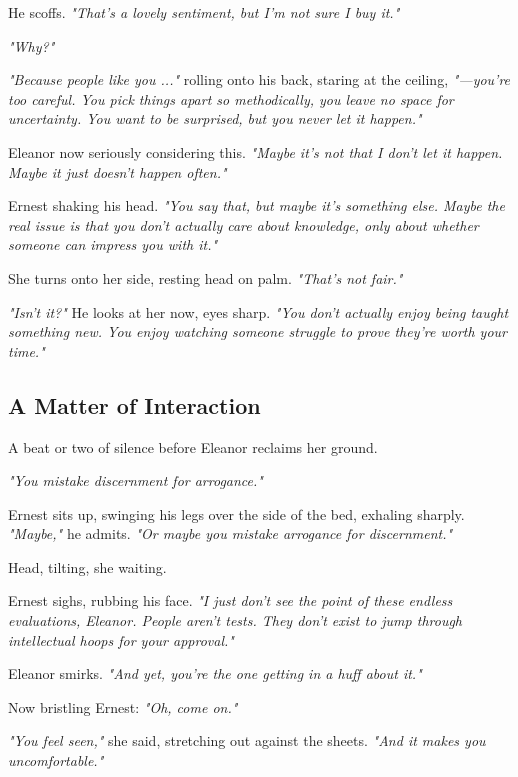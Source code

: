 He scoffs.  
\textit{"That’s a lovely sentiment, but I’m not sure I buy it."}

\textit{"Why?"}

\smallskip

\textit{"Because people like you ..."} rolling onto his back, staring at the ceiling, \textit{"—you’re too careful. You pick things apart so methodically, you leave no space for uncertainty. You want to be surprised, but you never let it happen."}

Eleanor now seriously considering this.  
\textit{"Maybe it’s not that I don’t let it happen. Maybe it just doesn’t happen often."}

Ernest shaking his head.  
\textit{"You say that, but maybe it’s something else. Maybe the real issue is that you don’t actually care about knowledge, only about whether someone can impress you with it."}

\noindent
She turns onto her side, resting head on palm.  
\textit{"That’s not fair."}

\textit{"Isn’t it?"} He looks at her now, eyes sharp.  
\textit{"You don’t actually enjoy being taught something new. You enjoy watching someone struggle to prove they’re worth your time."}

\subsection*{A Matter of Interaction}
A beat or two of silence before Eleanor reclaims her ground.

\textit{"You mistake discernment for arrogance."}

Ernest sits up, swinging his legs over the side of the bed, exhaling sharply.  
\textit{"Maybe,"} he admits.  
\textit{"Or maybe you mistake arrogance for discernment."}

Head, tilting, she waiting.

Ernest sighs, rubbing his face.  
\textit{"I just don’t see the point of these endless evaluations, Eleanor. People aren’t tests. They don’t exist to jump through intellectual hoops for your approval."}

Eleanor smirks.  
\textit{"And yet, you’re the one getting in a huff about it."}

Now bristling Ernest:  
\textit{"Oh, come on."}

\textit{"You feel seen,"} she said, stretching out against the sheets.  
\textit{"And it makes you uncomfortable."}


